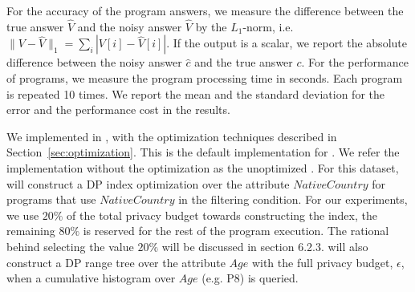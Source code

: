  For the accuracy of the program answers, we measure the difference between the true answer $\hat{V}$ and the noisy answer $\hat{V}$ by the $L_1$-norm, i.e. $\|V-\hat{V}\|_1 = \sum_{i} |V[i]-\hat{V}[i]|$. If the output is a scalar, we report the absolute difference between the noisy answer $\hat{c}$ and the true answer $c$. For the performance of \system programs, we measure the program processing time in seconds. Each program is repeated 10 times. We report the mean and the standard deviation for the error and the performance cost in the results.


 We implemented  \system in , with the optimization techniques described in Section~\ref{sec:optimization}. This is the default implementation for \system. We refer the implementation without the optimization as the unoptimized \system.  For this dataset, \system will construct a DP index optimization over the attribute $NativeCountry$ for programs that use $NativeCountry$ in the filtering condition. For our experiments, we use $20\%$ of the total privacy budget towards constructing the index, the remaining $80\%$ is reserved for the rest of the program execution. The rational behind selecting the value $20\%$ will be discussed in section 6.2.3. \system will also construct a DP range tree over the attribute $Age$ with the full privacy budget, $\epsilon$, when a cumulative histogram over $Age$ (e.g. P8) is queried. 




